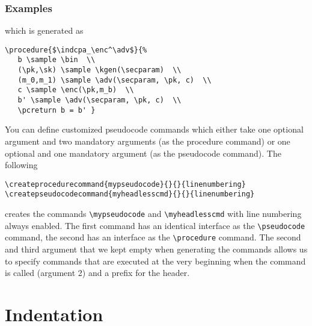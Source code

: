 \documentclass[a4paper]{report}
\begin{document}
\subsubsection{Examples}
\begin{center}
\end{center}
which is generated as
\begin{lstlisting}
\procedure{$\indcpa_\enc^\adv$}{%
   b \sample \bin  \\
   (\pk,\sk) \sample \kgen(\secparam)  \\
   (m_0,m_1) \sample \adv(\secparam, \pk, c)  \\
   c \sample \enc(\pk,m_b)  \\
   b' \sample \adv(\secparam, \pk, c)  \\
   \pcreturn b = b' }
\end{lstlisting}

You can define customized pseudocode commands which either take one optional argument and two mandatory arguments (as the procedure command)
or one optional and one mandatory argument (as the pseudocode command). The following
\begin{lstlisting}
\createprocedurecommand{mypseudocode}{}{}{linenumbering}
\createpseudocodecommand{myheadlesscmd}{}{}{linenumbering}
\end{lstlisting}
creates the commands \lstinline$\mypseudocode$ and \lstinline$\myheadlesscmd$ with line numbering always enabled. The first command
has an identical interface as the \lstinline$\pseudocode$ command, the second has an interface as the \lstinline$\procedure$ command.
The second and third argument that we kept empty when generating the commands allows us to specify commands that are executed at the
very beginning when the command is called (argument 2) and a prefix for the header.


\section{Indentation}
\end{document}
